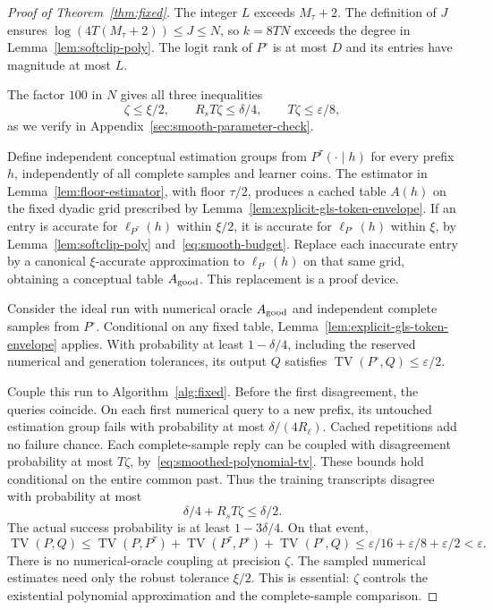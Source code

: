 \documentclass[11pt]{article}
\newcommand{\TV}{\operatorname{TV}}
\theoremstyle{definition}
\theoremstyle{remark}
\begin{document}
\begin{proof}[Proof of Theorem~\ref{thm:fixed}]
The integer $L$ exceeds $M_\tau+2$. The definition of $J$ ensures
$\log(4T(M_\tau+2))\le J\le N$, so $k=8TN$ exceeds the degree in Lemma~\ref{lem:softclip-poly}. The logit rank of $P^\circ$ is at most $D$ and its entries have magnitude at most $L$.

The factor $100$ in $N$ gives all three inequalities
\begin{equation}\label{eq:smooth-budget}
\zeta\le\xi/2,\qquad
R_sT\zeta\le\delta/4,\qquad
T\zeta\le\varepsilon/8,
\end{equation}
as we verify in Appendix~\ref{sec:smooth-parameter-check}.

Define independent conceptual estimation groups from $P^\tau(\cdot\mid h)$ for every prefix $h$, independently of all complete samples and learner coins. The estimator in Lemma~\ref{lem:floor-estimator}, with floor $\tau/2$, produces a cached table $A(h)$ on the fixed dyadic grid prescribed by Lemma~\ref{lem:explicit-gls-token-envelope}. If an entry is accurate for $\ell_{P^\tau}(h)$ within $\xi/2$, it is accurate for $\ell_{P^\circ}(h)$ within $\xi$, by Lemma~\ref{lem:softclip-poly} and~\eqref{eq:smooth-budget}. Replace each inaccurate entry by a canonical $\xi$-accurate approximation to $\ell_{P^\circ}(h)$ on that same grid, obtaining a conceptual table $A_{\rm good}$. This replacement is a proof device.

Consider the ideal run with numerical oracle $A_{\rm good}$ and independent complete samples from $P^\circ$. Conditional on any fixed table, Lemma~\ref{lem:explicit-gls-token-envelope} applies. With probability at least $1-\delta/4$, including the reserved numerical and generation tolerances, its output $Q$ satisfies $\TV(P^\circ,Q)\le\varepsilon/2$.

Couple this run to Algorithm~\ref{alg:fixed}. Before the first disagreement, the queries coincide. On each first numerical query to a new prefix, its untouched estimation group fails with probability at most $\delta/(4R_\ell)$. Cached repetitions add no failure chance. Each complete-sample reply can be coupled with disagreement probability at most $T\zeta$, by~\eqref{eq:smoothed-polynomial-tv}. These bounds hold conditional on the entire common past. Thus the training transcripts disagree with probability at most
\[
\delta/4+R_sT\zeta\le\delta/2.
\]
The actual success probability is at least $1-3\delta/4$. On that event,
\[
\TV(P,Q)
\le\TV(P,P^\tau)+\TV(P^\tau,P^\circ)+\TV(P^\circ,Q)
\le\varepsilon/16+\varepsilon/8+\varepsilon/2<\varepsilon.
\]
There is no numerical-oracle coupling at precision $\zeta$. The sampled numerical estimates need only the robust tolerance $\xi/2$. This is essential: $\zeta$ controls the existential polynomial approximation and the complete-sample comparison.


\end{proof}
\end{document}

